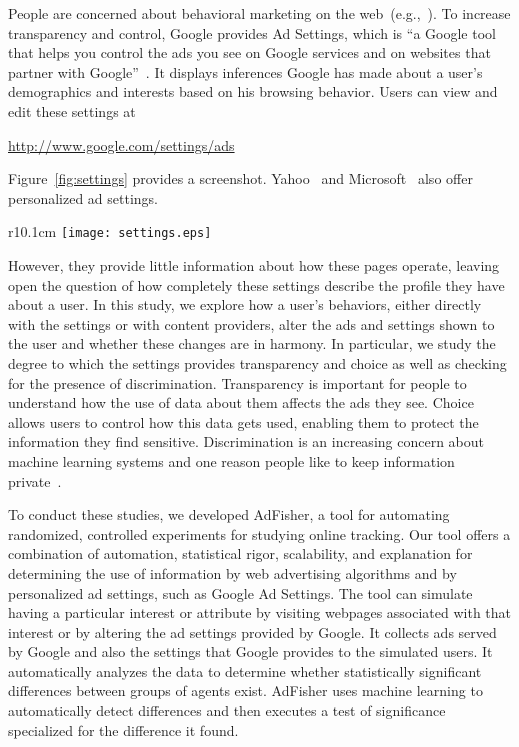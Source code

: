 \documentclass{article}
\begin{document}
People are concerned about behavioral marketing on the web~(e.g.,~\cite{ur12soups}). To increase transparency and control, Google provides Ad Settings, which is ``a Google tool that helps you control the ads you see on Google services and on websites that partner with Google''~\cite{google-ad-settings-help}. It displays inferences Google has made about a user's demographics and interests based on his browsing behavior.
Users can view and edit these settings at\\
\centerline{\url{http://www.google.com/settings/ads}} Figure~\ref{fig:settings} provides a screenshot.
Yahoo~\cite{yahoo-help}
and Microsoft~\cite{microsoft-choice} also offer personalized ad settings.

\begin{wrapfigure}{r}{10.1cm}
\centering
\texttt{[image: settings.eps]}
\caption{Screenshot of Google's Ad Settings webpage}
\label{fig:settings}
\end{wrapfigure}

However, they provide little information about how these pages operate, leaving open the question of
how completely these settings describe the profile they have about a user. In this study, we explore how a user's behaviors, either directly with the settings or with content providers, alter the ads and settings shown to the user and whether these changes are in harmony. 
In particular, we study the degree to which the settings provides transparency and choice as well as checking for the presence of discrimination.
Transparency is important for people to understand how the use of data about them affects the ads they see.
Choice allows users to control how this data gets used, enabling them to protect the information they find sensitive.
Discrimination is an increasing concern about machine learning systems and one reason people like to keep information private~\cite{bigdata14whitehouse, zemel13icml}.







To conduct these studies, we developed AdFisher, a tool for automating randomized, controlled experiments for studying online tracking.
Our tool offers a combination of automation, statistical rigor, scalability, and explanation for determining the use of information by web advertising algorithms and by personalized ad settings, such as Google Ad Settings.
The tool can simulate having a particular interest or attribute by visiting webpages associated with that interest or by altering the ad settings provided by Google.  It collects ads served by Google and also the settings that Google provides to the simulated users. It automatically analyzes the data to determine whether statistically significant differences between groups of agents exist.  AdFisher uses machine learning to automatically detect differences and then executes a test of significance specialized for the difference it found.
\end{document}

